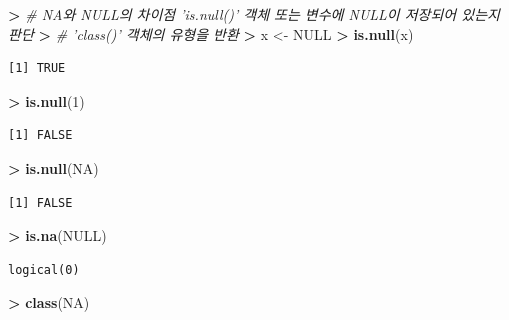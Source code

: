 \documentclass[11pt,a4paper]{book}
\newenvironment{Shaded}{\begin{snugshade}}{\end{snugshade}}
\newcommand{\KeywordTok}[1]{\textcolor[rgb]{0.13,0.29,0.53}{\textbf{#1}}}
\newcommand{\DecValTok}[1]{\textcolor[rgb]{0.00,0.00,0.81}{#1}}
\newcommand{\StringTok}[1]{\textcolor[rgb]{0.31,0.60,0.02}{#1}}
\newcommand{\CommentTok}[1]{\textcolor[rgb]{0.56,0.35,0.01}{\textit{#1}}}
\newcommand{\OtherTok}[1]{\textcolor[rgb]{0.56,0.35,0.01}{#1}}
\newcommand{\OperatorTok}[1]{\textcolor[rgb]{0.81,0.36,0.00}{\textbf{#1}}}
\newcommand{\ErrorTok}[1]{\textcolor[rgb]{0.64,0.00,0.00}{\textbf{#1}}}
\newcommand{\NormalTok}[1]{#1}
\theoremstyle{definition}
\theoremstyle{definition}
\theoremstyle{definition}
\theoremstyle{remark}
\begin{document}
\begin{Shaded}
\begin{Highlighting}[]
\OperatorTok{>}\StringTok{ }\CommentTok{# NA와 NULL의 차이점 'is.null()' 객체 또는 변수에 NULL이 저장되어 있는지 판단}
\ErrorTok{>}\StringTok{ }\CommentTok{# 'class()' 객체의 유형을 반환}
\ErrorTok{>}\StringTok{ }\NormalTok{x <-}\StringTok{ }\OtherTok{NULL}
\OperatorTok{>}\StringTok{ }\KeywordTok{is.null}\NormalTok{(x)}
\end{Highlighting}
\end{Shaded}

\begin{verbatim}
[1] TRUE
\end{verbatim}

\begin{Shaded}
\begin{Highlighting}[]
\OperatorTok{>}\StringTok{ }\KeywordTok{is.null}\NormalTok{(}\DecValTok{1}\NormalTok{)}
\end{Highlighting}
\end{Shaded}

\begin{verbatim}
[1] FALSE
\end{verbatim}

\begin{Shaded}
\begin{Highlighting}[]
\OperatorTok{>}\StringTok{ }\KeywordTok{is.null}\NormalTok{(}\OtherTok{NA}\NormalTok{)}
\end{Highlighting}
\end{Shaded}

\begin{verbatim}
[1] FALSE
\end{verbatim}

\begin{Shaded}
\begin{Highlighting}[]
\OperatorTok{>}\StringTok{ }\KeywordTok{is.na}\NormalTok{(}\OtherTok{NULL}\NormalTok{)}
\end{Highlighting}
\end{Shaded}

\begin{verbatim}
logical(0)
\end{verbatim}

\begin{Shaded}
\begin{Highlighting}[]
\OperatorTok{>}\StringTok{ }\KeywordTok{class}\NormalTok{(}\OtherTok{NA}\NormalTok{)}
\end{Highlighting}
\end{Shaded}
\end{document}
